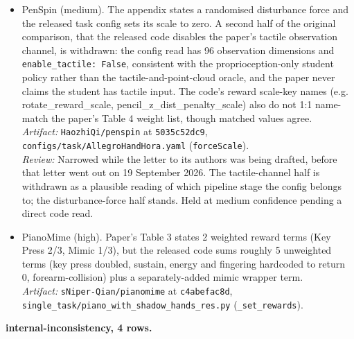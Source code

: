 \begin{itemize}
  \\ \emph{Artifact:} \texttt{PKU-EPIC/\allowbreak{}UniDexGrasp} at \texttt{36c9bfcf7c}, \texttt{dexgrasp\_\allowbreak{}policy/\allowbreak{}dexgrasp/\allowbreak{}tasks/\allowbreak{}shadow\_\allowbreak{}hand\_\allowbreak{}grasp.py} (\texttt{compute\_\allowbreak{}hand\_\allowbreak{}reward, goal\_\allowbreak{}cond branch}).
\item PenSpin \cite{penspin_2024} (medium). The appendix states a randomised disturbance force and the released task config sets its scale to zero. A second half of the original comparison, that the released code disables the paper's tactile observation channel, is withdrawn: the config read has 96 observation dimensions and \texttt{enable\_tactile: False}, consistent with the proprioception-only student policy rather than the tactile-and-point-cloud oracle, and the paper never claims the student has tactile input. The code's reward scale-key names (e.g. rotate\_\allowbreak{}reward\_\allowbreak{}scale, pencil\_\allowbreak{}z\_\allowbreak{}dist\_\allowbreak{}penalty\_\allowbreak{}scale) also do not 1:1 name-match the paper's Table 4 weight list, though matched values agree.
  \\ \emph{Artifact:} \texttt{HaozhiQi/\allowbreak{}penspin} at \texttt{5035c52dc9}, \texttt{configs/\allowbreak{}task/\allowbreak{}AllegroHandHora.yaml} (\texttt{forceScale}).
  \\ \emph{Review:} Narrowed while the letter to its authors was being drafted, before that letter went out on 19 September 2026. The tactile-channel half is withdrawn as a plausible reading of which pipeline stage the config belongs to; the disturbance-force half stands. Held at medium confidence pending a direct code read.
\item PianoMime \cite{pianomime_2024} (high). Paper's Table 3 states 2 weighted reward terms (Key Press 2/3, Mimic 1/3), but the released code sums roughly 5 unweighted terms (key press doubled, sustain, energy and fingering hardcoded to return 0, forearm-collision) plus a separately-added mimic wrapper term.
  \\ \emph{Artifact:} \texttt{sNiper-Qian/\allowbreak{}pianomime} at \texttt{c4abefac8d}, \texttt{single\_\allowbreak{}task/\allowbreak{}piano\_\allowbreak{}with\_\allowbreak{}shadow\_\allowbreak{}hands\_\allowbreak{}res.py} (\texttt{\_\allowbreak{}set\_\allowbreak{}rewards}).
\end{itemize}

\textbf{internal-inconsistency, 4 rows.}


